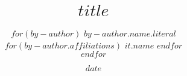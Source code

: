 \title{$title$}

\author{
  $for(by-author)$
    {$by-author.name.literal$  \href{mailto:$by-author.email$}{\Letter}} \\
    $for(by-author.affiliations)$
      $it.name$
    $endfor$ \\
  $endfor$}

\date{$date$}